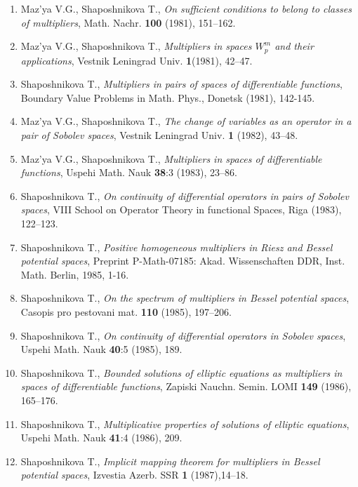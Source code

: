 \documentclass{article}
\begin{document}
\begin{enumerate}
\item Maz'ya V.G., Shaposhnikova T., {\it On sufficient conditions to
belong to classes of
multipliers}, Math. Nachr. {\bf 100} (1981), 151--162.

\item Maz'ya V.G., Shaposhnikova T., {\it Multipliers in spaces
$W_p^m$ and their applications},
Vestnik Leningrad Univ. {\bf 1}(1981), 42--47.

\item Shaposhnikova T., {\it Multipliers in pairs of spaces of
differentiable functions},
Boundary Value Problems in Math. Phys., Donetsk (1981), 142-145.

\item Maz'ya V.G., Shaposhnikova T., {\it The change of variables as
an operator in a pair of Sobolev
spaces}, Vestnik Leningrad Univ. {\bf 1} (1982), 43--48.

\item Maz'ya V.G., Shaposhnikova T., {\it Multipliers in spaces of
differentiable functions}, Uspehi
Math. Nauk {\bf 38}:3 (1983), 23--86.

\item Shaposhnikova T., {\it On continuity of differential operators
in pairs of Sobolev
spaces}, VIII School on Operator Theory in functional Spaces, Riga
(1983), 122--123.

\item Shaposhnikova T., {\it Positive homogeneous multipliers in
Riesz and Bessel
potential spaces}, Preprint P-Math-07185: Akad. Wissenschaften DDR,
Inst. Math. Berlin, 1985, 1-16.

\item Shaposhnikova T., {\it On the spectrum of multipliers in Bessel
potential spaces},
Casopis pro pestovani mat. {\bf 110} (1985), 197--206.

\item Shaposhnikova T., {\it On continuity of differential operators
in Sobolev spaces},
Uspehi Math. Nauk {\bf 40}:5 (1985), 189.

\item Shaposhnikova T., {\it Bounded solutions of elliptic equations
as multipliers in
spaces of differentiable functions}, Zapiski Nauchn. Semin. LOMI {\bf
149} (1986), 165--176.

\item Shaposhnikova T., {\it Multiplicative properties of solutions of
elliptic
equations}, Uspehi Math. Nauk {\bf 41}:4 (1986), 209.

\item Shaposhnikova T., {\it Implicit mapping theorem for multipliers
in Bessel potential
spaces}, Izvestia Azerb. SSR {\bf 1} (1987),14--18.


\end{enumerate}
\end{document}
